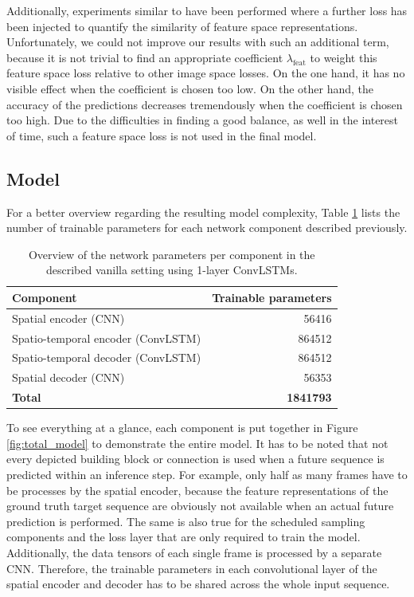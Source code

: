 Additionally, experiments similar to \parencite{gen_img_perc_sim} have been performed where a further loss has been injected to quantify the similarity of feature space representations. Unfortunately, we could not improve our results with such an additional term, because it is not trivial to find an appropriate coefficient $\lambda_{\textrm{feat}}$ to weight this feature space loss relative to other image space losses. On the one hand, it has no visible effect when the coefficient is chosen too low. On the other hand, the accuracy of the predictions decreases tremendously when the coefficient is chosen too high. Due to the difficulties in finding a good balance, as well in the interest of time, such a feature space loss is not used in the final model.


\subsection{Model}

For a better overview regarding the resulting model complexity, Table \ref{tab:model_params} lists the number of trainable parameters for each network component described previously.

\begin{table}[htpb]
  \centering
  \begin{tabular}{l r}
    \toprule
      \textbf{Component} & \textbf{Trainable parameters} \\
    \midrule
      Spatial encoder \footnotesize{(CNN)} & \num{56416} \\
      Spatio-temporal encoder \footnotesize{(ConvLSTM)} & \num{864512} \\
      Spatio-temporal decoder \footnotesize{(ConvLSTM)} & \num{864512} \\
      Spatial decoder \footnotesize{(CNN)} & \num{56353} \\
    \midrule
    \midrule
      \textbf{Total} & \textbf{\num{1841793}} \\
    \bottomrule
  \end{tabular}
  \caption[Model Parameters]{Overview of the network parameters per component in the described vanilla setting using 1-layer ConvLSTMs.}\label{tab:model_params}
\end{table}

To see everything at a glance, each component is put together in Figure \ref{fig:total_model} to demonstrate the entire model. It has to be noted that not every depicted building block or connection is used when a future sequence is predicted within an inference step. For example, only half as many frames have to be processes by the spatial encoder, because the feature representations of the ground truth target sequence are obviously not available when an actual future prediction is performed. The same is also true for the scheduled sampling components and the loss layer that are only required to train the model. Additionally, the data tensors of each single frame is processed by a separate CNN. Therefore, the trainable parameters in each convolutional layer of the spatial encoder and decoder has to be shared across the whole input sequence. 

